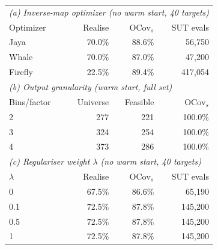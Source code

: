 \begin{tabular}{lrrr}
\toprule
\multicolumn{4}{l}{\emph{(a) Inverse-map optimizer (no warm start, 40 targets)}} \\
Optimizer & Realise & $\mathrm{OCov}_s$ & SUT evals \\
\midrule
Jaya & 70.0\% & 88.6\% & 56{,}750 \\
Whale & 70.0\% & 87.0\% & 47{,}200 \\
Firefly & 22.5\% & 89.4\% & 417{,}054 \\
\midrule
\multicolumn{4}{l}{\emph{(b) Output granularity (warm start, full set)}} \\
Bins/factor & Universe & Feasible & $\mathrm{OCov}_s$ \\
\midrule
2 & 277 & 221 & 100.0\% \\
3 & 324 & 254 & 100.0\% \\
4 & 373 & 286 & 100.0\% \\
\midrule
\multicolumn{4}{l}{\emph{(c) Regulariser weight $\lambda$ (no warm start, 40 targets)}} \\
$\lambda$ & Realise & $\mathrm{OCov}_s$ & SUT evals \\
\midrule
0 & 67.5\% & 86.6\% & 65{,}190 \\
0.1 & 72.5\% & 87.8\% & 145{,}200 \\
0.5 & 72.5\% & 87.8\% & 145{,}200 \\
1 & 72.5\% & 87.8\% & 145{,}200 \\
\bottomrule
\end{tabular}
